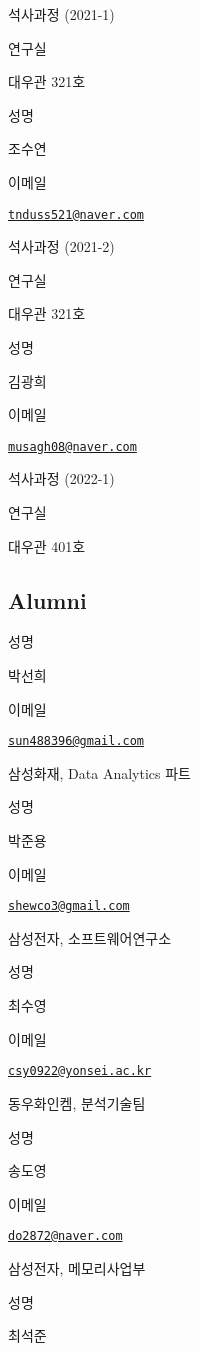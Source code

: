 \documentclass[
]{book}
\begin{document}
석사과정 (2021-1)

연구실

대우관 321호

성명

조수연

이메일

\href{mailto:tnduss521@naver.com}{\nolinkurl{tnduss521@naver.com}}

석사과정 (2021-2)

연구실

대우관 321호

성명

김광희

이메일

\href{mailto:musagh08@naver.com}{\nolinkurl{musagh08@naver.com}}

석사과정 (2022-1)

연구실

대우관 401호

\hypertarget{alumni}{%
\subsection*{Alumni}\label{alumni}}

성명

박선희

이메일

\href{mailto:sun488396@gmail.com}{\nolinkurl{sun488396@gmail.com}}

삼성화재, Data Analytics 파트

성명

박준용

이메일

\href{mailto:shewco3@gmail.com}{\nolinkurl{shewco3@gmail.com}}

삼성전자, 소프트웨어연구소

성명

최수영

이메일

\href{mailto:csy0922@yonsei.ac.kr}{\nolinkurl{csy0922@yonsei.ac.kr}}

동우화인켐, 분석기술팀

성명

송도영

이메일

\href{mailto:do2872@naver.com}{\nolinkurl{do2872@naver.com}}

삼성전자, 메모리사업부

성명

최석준
\end{document}
